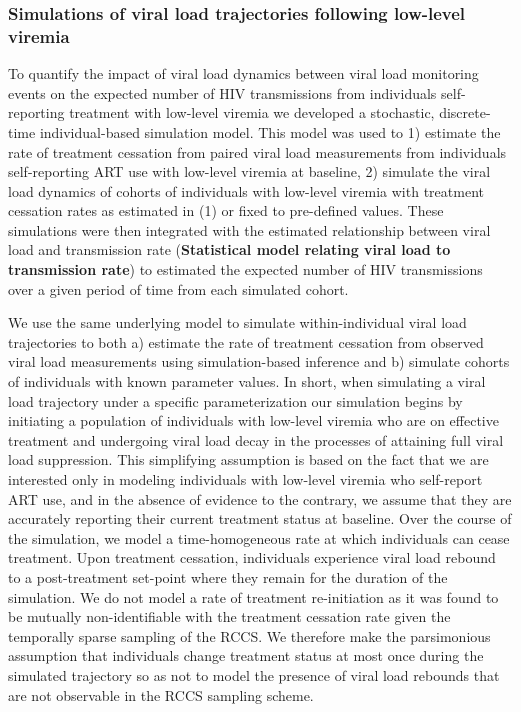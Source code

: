 \documentclass{article}[11pt]
\begin{document}
\subsubsection*{Simulations of viral load trajectories following low-level viremia}
To quantify the impact of viral load dynamics between viral load monitoring events on the expected number of HIV transmissions from individuals self-reporting treatment with low-level viremia we developed a stochastic, discrete-time individual-based simulation model. This model was used to 1) estimate the rate of treatment cessation from paired viral load measurements from individuals self-reporting ART use with low-level viremia at baseline, 2) simulate the viral load dynamics of cohorts of individuals with low-level viremia with treatment cessation rates as estimated in (1) or fixed to pre-defined values. These simulations were then integrated with the estimated relationship between viral load and transmission rate (\textbf{Statistical model relating viral load to transmission rate}) to estimated the expected number of HIV transmissions over a given period of time from each simulated cohort. 

We use the same underlying model to simulate within-individual viral load trajectories to both a) estimate the rate of treatment cessation from observed viral load measurements using simulation-based inference and b) simulate cohorts of individuals with known parameter values. In short, when simulating a viral load trajectory under a specific parameterization our simulation begins by initiating a population of individuals with low-level viremia who are on effective treatment and undergoing viral load decay in the processes of attaining full viral load suppression. This simplifying assumption is based on the fact that we are interested only in modeling individuals with low-level viremia who self-report ART use, and in the absence of evidence to the contrary, we assume that they are accurately reporting their current treatment status at baseline. Over the course of the simulation, we model a time-homogeneous rate at which individuals can cease treatment. Upon treatment cessation, individuals experience viral load rebound to a post-treatment set-point where they remain for the duration of the simulation. We do not model a rate of treatment re-initiation as it was found to be mutually non-identifiable with the treatment cessation rate given the temporally sparse sampling of the RCCS. We therefore make the parsimonious assumption that individuals change treatment status at most once during the simulated trajectory so as not to model the presence of viral load rebounds that are not observable in the RCCS sampling scheme. 
\end{document}
